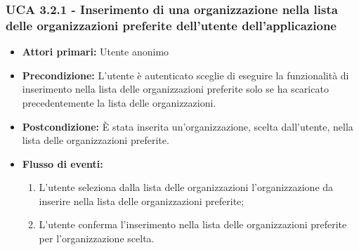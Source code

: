 \subsubsection{UCA 3.2.1 - Inserimento di una organizzazione nella lista delle organizzazioni preferite dell'utente dell'applicazione}%
\begin{itemize}
	\item \textbf{Attori primari:} Utente anonimo
	\item \textbf{Precondizione:} L'utente è autenticato sceglie di eseguire la funzionalità di inserimento nella lista delle organizzazioni preferite solo se ha scaricato precedentemente la lista delle organizzazioni.
	\item \textbf{Postcondizione:} È stata inserita un'organizzazione, scelta dall'utente, nella lista delle organizzazioni preferite.
	\item \textbf{Flusso di eventi:}
	\begin{enumerate}
		\item L'utente seleziona dalla lista delle organizzazioni l'organizzazione da inserire nella lista delle organizzazioni preferite;
		\item L'utente conferma l'inserimento nella lista delle organizzazioni preferite per l'organizzazione scelta.
	\end{enumerate}
\end{itemize}

